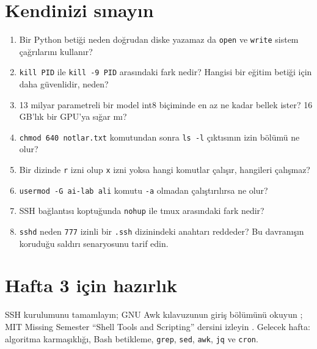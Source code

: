 \documentclass[11pt,a4paper]{article}
\begin{document}
\section{Kendinizi sınayın}
\begin{enumerate}
  \item Bir Python betiği neden doğrudan diske yazamaz da \texttt{open} ve \texttt{write} sistem çağrılarını kullanır?
  \item \texttt{kill PID} ile \texttt{kill -9 PID} arasındaki fark nedir? Hangisi bir eğitim betiği için daha güvenlidir, neden?
  \item 13 milyar parametreli bir model int8 biçiminde en az ne kadar bellek ister? 16 GB'lık bir GPU'ya sığar mı?
  \item \texttt{chmod 640 notlar.txt} komutundan sonra \texttt{ls -l} çıktısının izin bölümü ne olur?
  \item Bir dizinde \texttt{r} izni olup \texttt{x} izni yoksa hangi komutlar çalışır, hangileri çalışmaz?
  \item \texttt{usermod -G ai-lab ali} komutu \texttt{-a} olmadan çalıştırılırsa ne olur?
  \item SSH bağlantısı koptuğunda \texttt{nohup} ile tmux arasındaki fark nedir?
  \item \texttt{sshd} neden \texttt{777} izinli bir \texttt{.ssh} dizinindeki anahtarı reddeder? Bu davranışın koruduğu saldırı senaryosunu tarif edin.
\end{enumerate}

\section*{Hafta 3 için hazırlık}
SSH kurulumunu tamamlayın; GNU Awk kılavuzunun giriş bölümünü okuyun \cite{gawk}; MIT Missing Semester ``Shell Tools and Scripting'' dersini izleyin \cite{missing2}. Gelecek hafta: algoritma karmaşıklığı, Bash betikleme, \texttt{grep}, \texttt{sed}, \texttt{awk}, \texttt{jq} ve \texttt{cron}.
\end{document}

